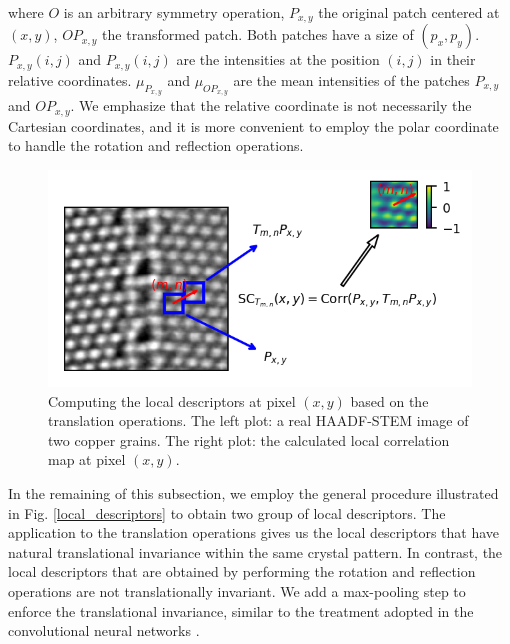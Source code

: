 \documentclass[twocolumn,amsmath, floatfix]{revtex4}
\begin{document}
where $O$ is an arbitrary symmetry operation, $P_{x,y}$ the original patch centered at $(x,y)$, $OP_{x,y}$ the transformed patch. Both patches have a size of $(p_x, p_y)$.  $P_{x,y}(i,j)$ and $P_{x,y}(i,j)$ are the intensities at the position $(i,j)$ in their relative coordinates. $\mu_{P_{x,y}}$ and $\mu_{OP_{x,y}}$  are the mean intensities of the patches $P_{x,y}$ and $OP_{x,y}$.  We emphasize that the relative coordinate is not necessarily the Cartesian coordinates, and it is more convenient to employ the polar coordinate to handle the rotation and reflection operations.
\begin{figure}[htbp]
\centering
\includegraphics[width=1.\columnwidth]{schematic_diagram_local_correlation_map.png}
\caption{Computing the local descriptors at pixel $(x,y)$ based on the translation operations. The left plot: a real HAADF-STEM image of two copper grains. The right plot: the calculated local correlation map at pixel $(x,y)$. } 
\label{fig:local_correlation_map}
\end{figure}

In the remaining of this subsection, we employ the general procedure illustrated in Fig. \ref{local_descriptors} to obtain two group of local descriptors. The application to the translation operations gives us the local descriptors that have natural translational invariance within the same crystal pattern. In contrast, the local descriptors that are obtained by performing the rotation and reflection operations are not translationally invariant. We add a max-pooling step to enforce the translational invariance, similar to the treatment adopted in the convolutional neural networks \cite{Lecun2010}. 
\end{document}
